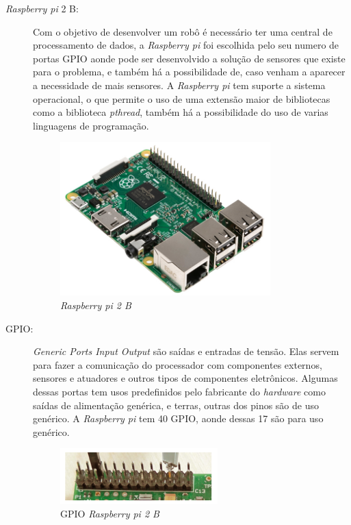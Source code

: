 \begin{description}
\item[\textit{Raspberry pi} 2 B:] Com o objetivo de desenvolver um robô é
necessário ter uma central de processamento de dados, a \textit{Raspberry pi} foi
escolhida pelo seu numero de portas GPIO aonde pode ser desenvolvido a solução
de sensores que existe para o problema, e também há a possibilidade de, caso
venham a aparecer a necessidade de mais sensores. A \textit{Raspberry pi} tem suporte a
sistema operacional, o que permite o uso de uma extensão maior de bibliotecas
como a biblioteca \textit{pthread}, também há a possibilidade do uso de varias linguagens
de programação.
\par
\begin{figure}[h]
  \centering
  \includegraphics[width=0.8\textwidth]{figures/rpi2b.jpg}
  \caption{\textit{Raspberry pi 2 B}}
  \label{fig:raspberry2b}
\end{figure}
\FloatBarrier

\item[GPIO:] \textit{Generic Ports Input Output} são saídas e entradas de tensão.
Elas servem para fazer a comunicação do processador com componentes externos,
sensores e atuadores e outros tipos de componentes eletrônicos. Algumas dessas
portas tem usos predefinidos pelo fabricante do \textit{hardware} como saídas de
alimentação genérica, e terras, outras dos pinos são de uso genérico. A
\textit{Raspberry pi} tem 40 GPIO, aonde dessas 17 são para uso genérico.
\par
\begin{figure}[h]
  \centering
  \includegraphics[width=0.6\textwidth]{figures/gpio.png}
  \caption{GPIO \textit{Raspberry pi 2 B}}
  \label{fig:raspberry2b}
\end{figure}
\FloatBarrier


\end{description}
